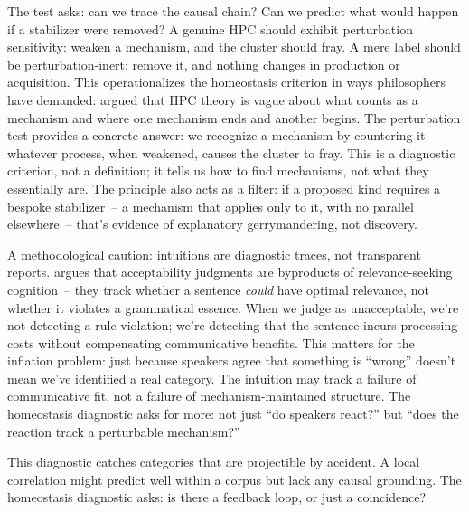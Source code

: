 The test asks: can we trace the causal chain? Can we predict what would happen if a stabilizer were removed? A genuine HPC should exhibit perturbation sensitivity: weaken a mechanism, and the cluster should fray. A mere label should be perturbation-inert: remove it, and nothing changes in production or acquisition. This operationalizes the homeostasis criterion in ways philosophers have demanded: \textcite{craver2009} argued that HPC theory is vague about what counts as a mechanism and where one mechanism ends and another begins. The perturbation test provides a concrete answer: we recognize a mechanism by countering it~-- whatever process, when weakened, causes the cluster to fray. This is a diagnostic criterion, not a definition; it tells us how to find mechanisms, not what they essentially are. The  principle also acts as a filter: if a proposed kind requires a bespoke stabilizer~-- a mechanism that applies only to it, with no parallel elsewhere~-- that's evidence of explanatory gerrymandering, not discovery.

A methodological caution: intuitions are diagnostic traces, not transparent reports. \textcite{scott-phillips2024intuitions} argues that acceptability judgments are byproducts of relevance-seeking cognition~-- they track whether a sentence \emph{could} have optimal relevance, not whether it violates a grammatical essence. When we judge  as unacceptable, we're not detecting a rule violation; we're detecting that the sentence incurs processing costs without compensating communicative benefits. This matters for the inflation problem: just because speakers agree that something is \enquote{wrong} doesn't mean we've identified a real category. The intuition may track a failure of communicative fit, not a failure of mechanism-maintained structure. The homeostasis diagnostic asks for more: not just \enquote{do speakers react?} but \enquote{does the reaction track a perturbable mechanism?}

This diagnostic catches categories that are projectible by accident. A local correlation might predict well within a corpus but lack any causal grounding. The homeostasis diagnostic asks: is there a feedback loop, or just a coincidence?

